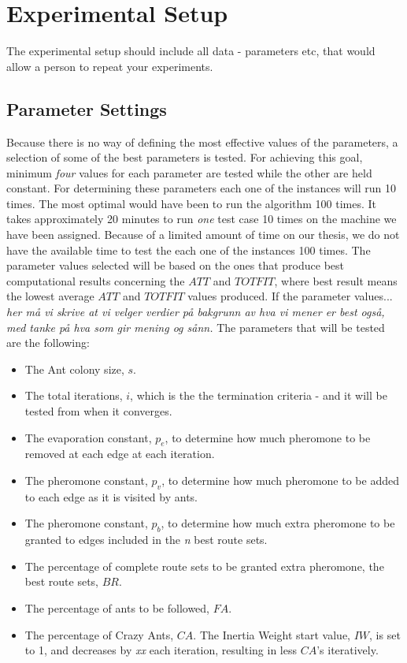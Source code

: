 \section{Experimental Setup}

The experimental setup should include all data - parameters etc, that would allow a person to repeat your experiments. 
 
\subsection{Parameter Settings}
\label{subsec:parameterSettings_setup}

Because there is no way of defining the most effective values of the parameters, a selection of some of the best parameters is tested. For achieving this goal, minimum \textit{four} values for each parameter are tested while the other are held constant. For determining these parameters each one of the instances will run 10 times. The most optimal would have been to run the algorithm 100 times. It takes approximately 20 minutes to run \textit{one} test case 10 times on the machine we have been assigned. Because of a limited amount of time on our thesis, we do not have the available time to test the each one of the instances 100 times. The parameter values selected will be based on the ones that produce best computational results concerning the $ATT$ and $TOTFIT$, where best result means the lowest average $ATT$ and $TOTFIT$ values produced. If the parameter values...\emph{\color{red} her må vi skrive at vi velger verdier på bakgrunn av hva vi mener er best også, med tanke på hva som gir mening og sånn. }  The parameters that will be tested are the following:

\begin{itemize}
\item The Ant colony size, $s$.
\item The total iterations, $i$, which is the the termination criteria - and it will be tested from when it converges. 
\item The evaporation constant, $p_{e}$, to determine how much pheromone to be removed at each edge at each iteration. 
\item The pheromone constant, $p_{v}$, to determine how much pheromone to be added to each edge as it is visited by ants. 
\item The pheromone constant, $p_{b}$, to determine how much extra pheromone to be granted to edges included in the \textit{n} best route sets.
\item The percentage of complete route sets to be granted extra pheromone, the best route sets, $BR$.
\item The percentage of ants to be followed, $FA$.
\item The percentage of Crazy Ants, $CA$. The Inertia Weight start value, $IW$, is set to 1, and decreases by \emph{\color{red}xx} each iteration, resulting in less $CA$'s iteratively.
\end{itemize}


